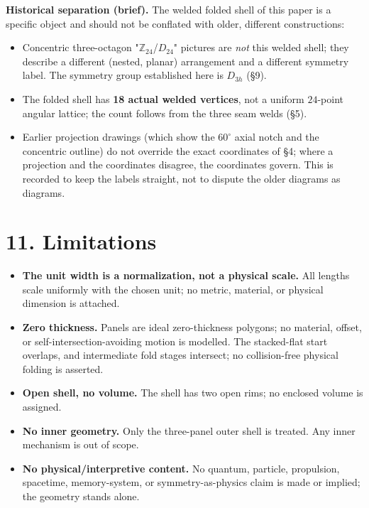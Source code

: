 \documentclass[
  11pt,
  a4paper,
]{article}
\providecommand{\tightlist}{%
  \setlength{\itemsep}{0pt}\setlength{\parskip}{0pt}}
\begin{document}
\textbf{Historical separation (brief).} The welded folded shell of this paper is a specific object and should not be conflated with older, different constructions:

\begin{itemize}
\tightlist
\item
  Concentric three-octagon "\(\mathbb Z_{24}\)/\(D_{24}\)" pictures are \emph{not} this welded shell; they describe a different (nested, planar) arrangement and a different symmetry label. The symmetry group established here is \(D_{3h}\) (§9).
\item
  The folded shell has \textbf{18 actual welded vertices}, not a uniform \(24\)-point angular lattice; the count follows from the three seam welds (§5).
\item
  Earlier projection drawings (which show the \(60^\circ\) axial notch and the concentric outline) do not override the exact coordinates of §4; where a projection and the coordinates disagree, the coordinates govern. This is recorded to keep the labels straight, not to dispute the older diagrams as diagrams.
\end{itemize}

\section{11. Limitations}\label{limitations}

\begin{itemize}
\tightlist
\item
  \textbf{The unit width is a normalization, not a physical scale.} All lengths scale uniformly with the chosen unit; no metric, material, or physical dimension is attached.
\item
  \textbf{Zero thickness.} Panels are ideal zero-thickness polygons; no material, offset, or self-intersection-avoiding motion is modelled. The stacked-flat start overlaps, and intermediate fold stages intersect; no collision-free physical folding is asserted.
\item
  \textbf{Open shell, no volume.} The shell has two open rims; no enclosed volume is assigned.
\item
  \textbf{No inner geometry.} Only the three-panel outer shell is treated. Any inner mechanism is out of scope.
\item
  \textbf{No physical/interpretive content.} No quantum, particle, propulsion, spacetime, memory-system, or symmetry-as-physics claim is made or implied; the geometry stands alone.
\end{itemize}
\end{document}
